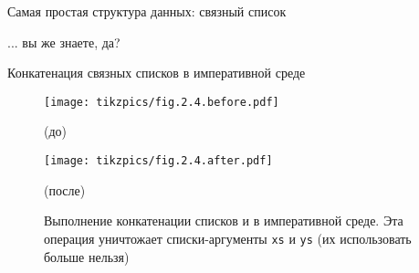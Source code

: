 \begin{frame}{Самая простая структура данных: связный список}
\begin{definition}
... вы же знаете, да?

\end{definition}

\begin{definition}[Список]
\end{definition}
\end{frame}

\begin{frame}{Конкатенация связных списков в императивной среде}
\begin{figure}[h]
  \texttt{[image: tikzpics/fig.2.4.before.pdf]}\par
	(до)\par\vspace{1em}
  \texttt{[image: tikzpics/fig.2.4.after.pdf]}\par
	(после)\par
	\caption{Выполнение конкатенации списков  и   в императивной среде. Эта операция уничтожает списки-аргументы \texttt{xs} и \texttt{ys} (их использовать больше нельзя)}
	\label{fig:2.4}
\end{figure}
\end{frame}


%


